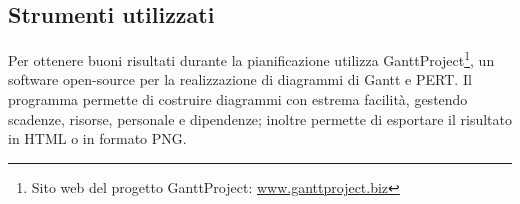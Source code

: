    \subsection{Strumenti utilizzati}
   Per ottenere buoni risultati durante la pianificazione \nomeAzienda{} utilizza GanttProject\footnote{Sito web del progetto GanttProject: \href{http://www.ganttproject.biz/}{www.ganttproject.biz}}, un software open-source per la realizzazione di diagrammi di \gls{Gantt} e \gls{PERT}. Il programma permette di costruire diagrammi con estrema facilità, gestendo scadenze, risorse, personale e dipendenze; inoltre permette di esportare il risultato in HTML o in formato PNG.\
